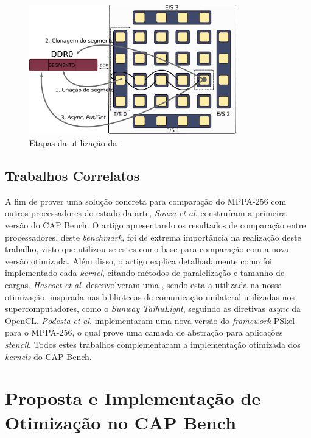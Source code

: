 \documentclass[a4paper,11pt]{article}
\newcommand{\etal}{\textit{et al}.\xspace}
\newcommand{\mppa}{MPPA-256\xspace}
\newcommand{\capb}{CAP Bench\xspace}
\begin{document}
\begin{figure}[H]
\centering
\includegraphics[width=9cm, keepaspectratio]{figs/putget.pdf}
\caption{Etapas da utilização da \api \async.}\par
\label{fig:asyncOverview}
\end{figure}


\subsection{Trabalhos Correlatos}

A fim de prover uma solução concreta para comparação do \mppa com outros processadores do estado da arte, \textit{Souza} \etal construíram a primeira versão do \capb \cite{Castro-Souza-CCPE:2016}. O artigo apresentando os resultados de comparação entre processadores, deste \textit{benchmark}, foi  de extrema importância na realização deste trabalho, visto que utilizou-se estes como base para comparação com a nova versão otimizada. Além disso, o artigo explica detalhadamente como foi implementado cada \textit{kernel}, citando métodos de paralelização e tamanho de cargas. \textit{Hascoet} \etal \cite{Hascoet2017} desenvolveram uma \api, sendo esta a utilizada na nossa otimização, inspirada nas bibliotecas de comunicação unilateral utilizadas nos supercomputadores, como o \textit{Sunway TaihuLight}, seguindo as diretivas \textit{async} da OpenCL. \textit{Podesta} \etal \cite{Podesta2018} implementaram uma nova versão do \textit{framework} PSkel para o \mppa, o qual prove uma camada de abstração para aplicações \textit{stencil}. Todos estes trabalhos complementaram a implementação otimizada dos \textit{kernels} do \capb.

\section{Proposta e Implementação de Otimização no \capb}
\label{sec:capbMPPA}
\end{document}
